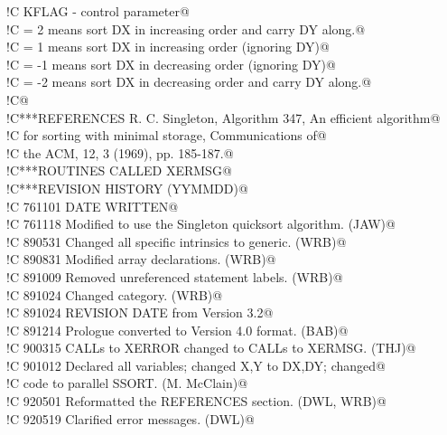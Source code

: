 \documentclass[10pt,a4paper,notitlepage]{article}
\begin{document}
\begin{flushleft}
\begin{list}{}{}
\mbox{}\verb@!C      KFLAG - control parameter@\\
\mbox{}\verb@!C            =  2  means sort DX in increasing order and carry DY along.@\\
\mbox{}\verb@!C            =  1  means sort DX in increasing order (ignoring DY)@\\
\mbox{}\verb@!C            = -1  means sort DX in decreasing order (ignoring DY)@\\
\mbox{}\verb@!C            = -2  means sort DX in decreasing order and carry DY along.@\\
\mbox{}\verb@!C@\\
\mbox{}\verb@!C***REFERENCES  R. C. Singleton, Algorithm 347, An efficient algorithm@\\
\mbox{}\verb@!C                 for sorting with minimal storage, Communications of@\\
\mbox{}\verb@!C                 the ACM, 12, 3 (1969), pp. 185-187.@\\
\mbox{}\verb@!C***ROUTINES CALLED  XERMSG@\\
\mbox{}\verb@!C***REVISION HISTORY  (YYMMDD)@\\
\mbox{}\verb@!C   761101  DATE WRITTEN@\\
\mbox{}\verb@!C   761118  Modified to use the Singleton quicksort algorithm.  (JAW)@\\
\mbox{}\verb@!C   890531  Changed all specific intrinsics to generic.  (WRB)@\\
\mbox{}\verb@!C   890831  Modified array declarations.  (WRB)@\\
\mbox{}\verb@!C   891009  Removed unreferenced statement labels.  (WRB)@\\
\mbox{}\verb@!C   891024  Changed category.  (WRB)@\\
\mbox{}\verb@!C   891024  REVISION DATE from Version 3.2@\\
\mbox{}\verb@!C   891214  Prologue converted to Version 4.0 format.  (BAB)@\\
\mbox{}\verb@!C   900315  CALLs to XERROR changed to CALLs to XERMSG.  (THJ)@\\
\mbox{}\verb@!C   901012  Declared all variables; changed X,Y to DX,DY; changed@\\
\mbox{}\verb@!C           code to parallel SSORT. (M. McClain)@\\
\mbox{}\verb@!C   920501  Reformatted the REFERENCES section.  (DWL, WRB)@\\
\mbox{}\verb@!C   920519  Clarified error messages.  (DWL)@\\

\end{list}
\end{flushleft}
\end{document}
